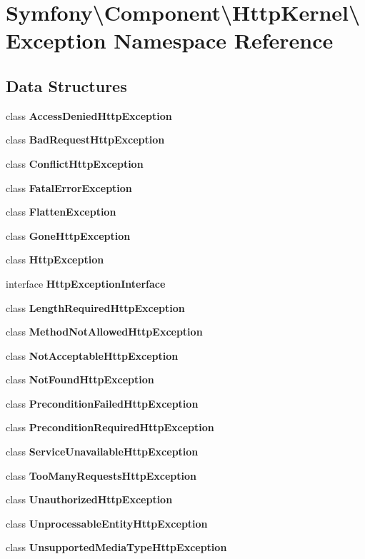 \section{Symfony\textbackslash{}Component\textbackslash{}Http\+Kernel\textbackslash{}Exception Namespace Reference}
\label{namespace_symfony_1_1_component_1_1_http_kernel_1_1_exception}
\subsection*{Data Structures}
\begin{DoxyCompactItemize}
\item 
class {\bf Access\+Denied\+Http\+Exception}
\item 
class {\bf Bad\+Request\+Http\+Exception}
\item 
class {\bf Conflict\+Http\+Exception}
\item 
class {\bf Fatal\+Error\+Exception}
\item 
class {\bf Flatten\+Exception}
\item 
class {\bf Gone\+Http\+Exception}
\item 
class {\bf Http\+Exception}
\item 
interface {\bf Http\+Exception\+Interface}
\item 
class {\bf Length\+Required\+Http\+Exception}
\item 
class {\bf Method\+Not\+Allowed\+Http\+Exception}
\item 
class {\bf Not\+Acceptable\+Http\+Exception}
\item 
class {\bf Not\+Found\+Http\+Exception}
\item 
class {\bf Precondition\+Failed\+Http\+Exception}
\item 
class {\bf Precondition\+Required\+Http\+Exception}
\item 
class {\bf Service\+Unavailable\+Http\+Exception}
\item 
class {\bf Too\+Many\+Requests\+Http\+Exception}
\item 
class {\bf Unauthorized\+Http\+Exception}
\item 
class {\bf Unprocessable\+Entity\+Http\+Exception}
\item 
class {\bf Unsupported\+Media\+Type\+Http\+Exception}
\end{DoxyCompactItemize}
